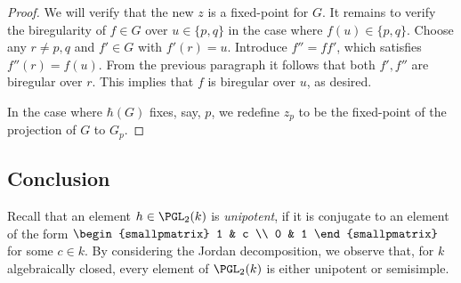 \begin{proof}
We will verify that the new $z$ is a fixed-point for $G$. It remains to verify the biregularity of $f \in G$ over $u\in \{p,q\}$ in the case where $f(u)\in \{p,q\}$. Choose any $r\neq p,q$ and $f'\in G$ with $f'(r)=u$. Introduce $f''=ff'$, which satisfies $f''(r)=f(u)$. From the previous paragraph it follows that both $f',f''$ are biregular over $r$. This implies that $f$ is biregular over $u$, as desired.

In the case where $\hbar(G)$ {fixes}, say, $p$, we redefine $z_p$ to be the fixed-point of the projection of $G$ to $G_p$.
\end{proof}

\subsection{Conclusion}

Recall that an element $h\in\PGL_2(k)$ is \emph{unipotent}, if it is conjugate to an element of the form $\begin{smallpmatrix}
1 & c \\
0 & 1
\end{smallpmatrix}$ for some $c\in k$. By considering the Jordan decomposition, we observe that, for $k$ algebraically closed, every element of $\PGL_2(k)$ is either unipotent or semisimple.

